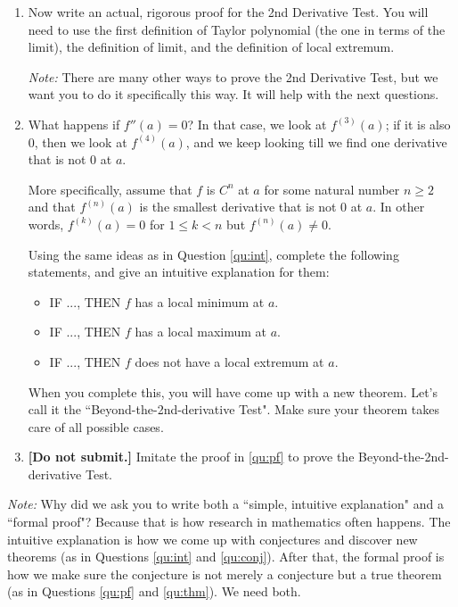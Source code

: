 \documentclass[12pt]{exam}
\begin{document}
\begin{enumerate}
\begin{enumerate}
			Using the idea that $f(x) \approx P_2(x)$ when $x$ is close to $a$, write an intuitive explanation for the 2nd Derivative Test.  
			
			\emph{Note:}  We are not asking for a proof yet.  Rather, we are asking for a short, simple, handwavy argument that would convince an average student that this result ``makes sense" and ``seems true".
			
		\item  \label{qu:pf} Now write an actual, rigorous proof for the 2nd Derivative Test.  You will need to use the first definition of Taylor polynomial (the one in terms of the limit), the definition of limit, and the definition of local extremum.
				
			\emph{Note:}  There are many other ways to prove the 2nd Derivative Test, but we want you to do it specifically this way. It will help with the next questions.
	
		\item \label{qu:conj} What happens if $f''(a)=0$?     In that case, we look at $f^{(3)}(a)$;  if it is also $0$, then we look at $f^{(4)}(a)$, and we keep looking till we find one derivative that is not $0$ at $a$.   
		
		More specifically, assume that $f$ is $C^n$ at $a$ for some natural number $n \geq 2$ and that $f^{(n)}(a)$ is the smallest derivative  that is not $0$ at $a$.   In other words, $f^{(k)}(a) =0$ for $ 1 \leq k < n$ but $f^{(n)}(a) \neq 0$.
		
		Using the same ideas as in Question \ref{qu:int}, complete the following statements, and give an intuitive explanation for them:
			\begin{itemize}
				\item  IF ..., THEN $f$ has a local minimum at $a$.
				\item  IF ..., THEN $f$ has a local maximum at $a$.
				\item  IF ..., THEN $f$ does not have a local extremum at $a$.
			\end{itemize}
		When you complete this, you will have come up with a new theorem.  Let's call it the ``Beyond-the-2nd-derivative Test".   Make sure your theorem takes care of all possible cases.  
		\item \label{qu:thm}  {\bf [Do not submit.]}  Imitate the proof in \ref{qu:pf} to prove the Beyond-the-2nd-derivative Test.		
	\end{enumerate}

\emph{Note:}  Why did we ask you to write both a ``simple, intuitive explanation" and a ``formal proof"?  Because that is how research in mathematics often happens.  The intuitive explanation is how we come up with conjectures and discover new theorems (as in Questions \ref{qu:int} and \ref{qu:conj}).   After that, the formal proof is how we make sure the conjecture is not merely a conjecture but a true theorem (as in Questions \ref{qu:pf} and \ref{qu:thm}).   We need both.

\end{enumerate}
\end{document}
